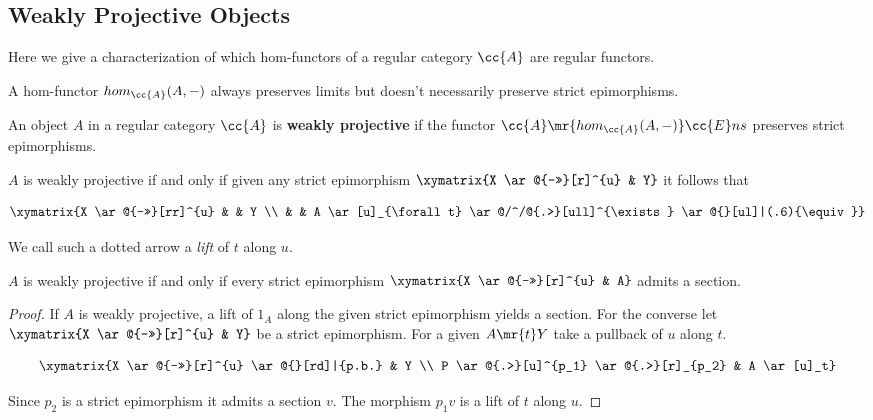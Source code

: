 \subsection{Weakly Projective Objects}
Here we give a characterization of which hom-functors of a regular category $\cc{A}$ are regular functors.

\begin{observation}
A hom-functor  $hom_{\cc{A}}(A,-)$ always preserves limits but doesn't necessarily preserve strict epimorphisms. 
\end{observation}


\begin{definition}
An object $A$ in a regular category $\cc{A}$ is \textbf{weakly projective} if the functor $\cc{A} \mr{hom_{\cc{A}}(A,-)} \cc{E}ns$ preserves strict epimorphisms.
\end{definition}

\begin{remark}
$A$ is weakly projective if and only if given any strict epimorphism $\xymatrix{X \ar@{->>}[r]^{u} &  Y}$  it follows that

\[
\xymatrix{X \ar@{->>}[rr]^{u} & & Y \\ & & A \ar[u]_{\forall t} \ar@/^/@{.>}[ull]^{\exists} \ar@{}[ul]|(.6){\equiv}}
\]

We call such a dotted arrow a \textit{lift} of $t$ along $u$.
\end{remark}


\begin{lemma}
$A$ is weakly projective if and only if every strict epimorphism $\xymatrix{X \ar@{->>}[r]^{u} & A}$ admits a section.
\end{lemma}

\begin{proof}
If $A$ is weakly projective, a lift of $1_A$ along the given strict epimorphism yields a section. For the converse let $\xymatrix{X \ar@{->>}[r]^{u} & Y}$ be a strict epimorphism. For a given $A \mr{t} Y$ take a pullback of $u$ along $t$.

\[
\xymatrix{X \ar@{->>}[r]^{u} \ar@{}[rd]|{p.b.} & Y \\ P \ar@{.>}[u]^{p_1} \ar@{.>}[r]_{p_2} & A \ar[u]_t}
\]

Since $p_2$ is a strict epimorphism it admits a section $v$. The morphism $p_1v$ is a lift of $t$ along $u$.
\end{proof} 
